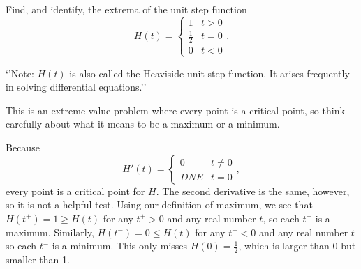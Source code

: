 \documentclass{ximera}
\author{Emma Smith Zbarsky}
\begin{document}
\begin{exercise}

Find, and identify, the extrema of the unit step function
\[H(t) = \begin{cases} 1 & t > 0 \\
\frac{1}{2} & t = 0 \\ 0 & t < 0 \end{cases}.\]

`'Note: $H(t)$ is also called the Heaviside unit step function. It
arises frequently in solving differential equations.''


\begin{hint}
This is an extreme value problem where every point is a critical point,
so think carefully about what it means to be a maximum or a minimum.
\end{hint}


\begin{hint}
Because \[H'(t) = \begin{cases} 0 & t \neq 0 \\
DNE & t = 0 \end{cases},\] every point is a critical point for $H$. The
second derivative is the same, however, so it is not a helpful test.
Using our definition of maximum, we see that $H(t^+)=1\geq H(t)$ for any
$t^+ > 0$ and any real number $t$, so each $t^+$ is a maximum.
Similarly, $H(t^-) = 0 \leq H(t)$ for any $t^- < 0$ and any real number
$t$ so each $t^-$ is a minimum. This only misses $H(0) = \frac{1}{2}$,
which is larger than 0 but smaller than 1.
\end{hint}


\begin{multipleChoice}
\end{multipleChoice}

\end{exercise}
\end{document}

